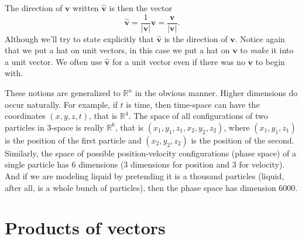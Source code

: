 \documentclass[12pt]{article}
\newcommand{\sabs}[1]{\lvert {#1} \rvert}
\newcommand{\R}{{\mathbb{R}}}
\begin{document}
The direction of $\mathbf{v}$ written $\hat{\mathbf{v}}$ is then
the vector
\[
\hat{\mathbf{v}} = \frac{1}{\sabs{\mathbf{v}}} \mathbf{v} = \frac{\mathbf{v}}{\sabs{\mathbf{v}}} .
\]
Although we'll try to state explicitly that $\hat{\mathbf{v}}$  is the direction of $\mathbf{v}$.
Notice again that we put a hat on unit vectors, in this case we put a hat
on $\mathbf{v}$ to \emph{make} it into a unit vector.
We often use $\hat{\mathbf{v}}$ for a unit vector even if there was no
$\mathbf{v}$ to begin with.

These notions are generalized to $\R^n$ in the obvious manner.
Higher dimensions do occur naturally.
For example, if $t$ is time, then time-space can have the coordinates $(x,y,z,t)$,
that is $\R^4$.  The space of all configurations of two particles in 3-space
is really $\R^6$, that is $(x_1,y_1,z_1,x_2,y_2,z_2)$, where
$(x_1,y_1,z_1)$ is the position of the first particle and $(x_2,y_2,z_2)$ is
the position of the second.
Similarly, the space of possible
position-velocity configurations (phase space)
of a single particle has 6 dimensions
(3 dimensions for position and 3 for velocity).
And if we are modeling liquid by pretending it
is a thousand particles (liquid, after all,
is a whole bunch of particles),
then the phase space has dimension 6000.


\section{Products of vectors}
\end{document}

